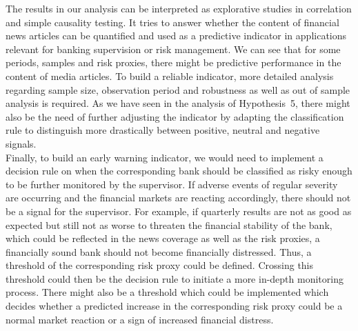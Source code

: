 The results in our analysis can be interpreted as explorative studies in correlation and simple causality testing. It tries to answer whether the content of financial news articles can be quantified and used as a predictive indicator in applications relevant for banking supervision or risk management. We can see that for some periods, samples and risk proxies, there might be predictive performance in the content of media articles. To build a reliable indicator, more detailed analysis regarding sample size, observation period and robustness as well as out of sample analysis is required. As we have seen in the analysis of \mbox{Hypothesis 5}, there might also be the need of further adjusting the indicator by adapting the classification rule to distinguish more drastically between positive, neutral and negative signals. \\

Finally, to build an early warning indicator, we would need to implement a decision rule on when the corresponding bank should be classified as risky enough to be further monitored by the supervisor. If adverse events of regular severity are occurring and the financial markets are reacting accordingly, there should not be a signal for the supervisor. For example, if quarterly results are not as good as expected but still not as worse to threaten the financial stability of the bank, which could be reflected in the news coverage as well as the risk proxies, a financially sound bank should not become financially distressed. Thus, a threshold of the corresponding risk proxy could be defined. Crossing this threshold could then be the decision rule to initiate a more in-depth monitoring process. There might also be a threshold which could be implemented which decides whether a predicted increase in the corresponding risk proxy could be a normal market reaction or a sign of increased financial distress. \\

